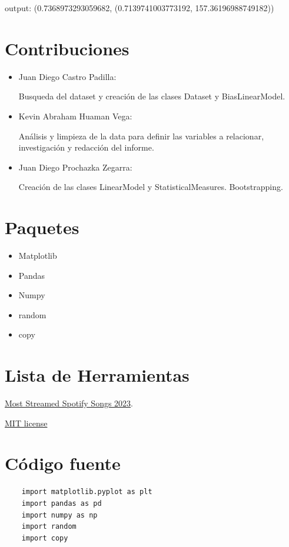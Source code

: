 \documentclass{report}
\begin{document}
        output:
        (0.7368973293059682, (0.7139741003773192, 157.36196988749182))

\chapter{Contribuciones}
        \begin{itemize}
            \item Juan Diego Castro Padilla:

            Busqueda del dataset y creaci\'on de las clases Dataset y BiasLinearModel.
            \item Kevin Abraham Huaman Vega:

            An\'alisis y limpieza de la data para definir las variables a relacionar, investigación y redacci\'on del informe.

            \item Juan Diego Prochazka Zegarra:

            Creaci\'on de las clases LinearModel y StatisticalMeasures. Bootstrapping.

            \end{itemize}
\chapter{Paquetes}
    \begin{itemize}
        \item Matplotlib
        \item Pandas
        \item Numpy
        \item random
        \item copy
    \end{itemize}

\chapter{Lista de Herramientas}
    \subtitle{Dataset}
        \href{https://www.kaggle.com/datasets/nelgiriyewithana/top-spotify-songs-2023}{Most Streamed Spotify Songs 2023}.

    \subtitle{Licence}
        \href{https://opensource.org/license/mit/}{MIT license}
\chapter{C\'odigo fuente}
    \subtitle{Importar las librer\'ias}
    \begin{lstlisting}
    import matplotlib.pyplot as plt
    import pandas as pd
    import numpy as np
    import random
    import copy
    \end{lstlisting}
\end{document}
